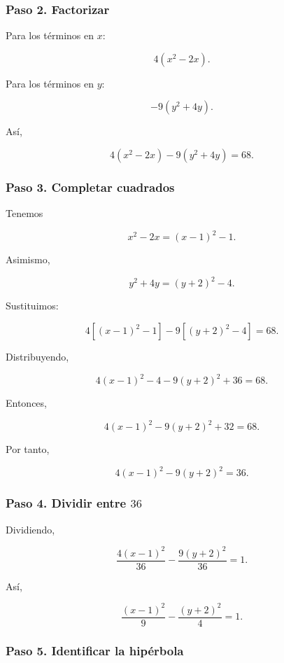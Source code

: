 \documentclass[12pt]{article}
\theoremstyle{plain}
\theoremstyle{definition}
\theoremstyle{remark}
\begin{document}
{%
\subsubsection*{Paso 2. Factorizar}

Para los términos en \(x\):

\[
4(x^2-2x).
\]

Para los términos en \(y\):

\[
-9(y^2+4y).
\]

Así,

\[
4(x^2-2x)-9(y^2+4y)=68.
\]

\subsubsection*{Paso 3. Completar cuadrados}

Tenemos

\[
x^2-2x
=
(x-1)^2-1.
\]

Asimismo,

\[
y^2+4y
=
(y+2)^2-4.
\]

Sustituimos:

\[
4\left[(x-1)^2-1\right]
-
9\left[(y+2)^2-4\right]
=
68.
\]

Distribuyendo,

\[
4(x-1)^2-4
-
9(y+2)^2
+
36
=
68.
\]

Entonces,

\[
4(x-1)^2
-
9(y+2)^2
+
32
=
68.
\]

Por tanto,

\[
4(x-1)^2-9(y+2)^2=36.
\]

\subsubsection*{Paso 4. Dividir entre \(36\)}

Dividiendo,

\[
\frac{4(x-1)^2}{36}
-
\frac{9(y+2)^2}{36}
=
1.
\]

Así,

\[
\boxed{
\frac{(x-1)^2}{9}
-
\frac{(y+2)^2}{4}
=
1.
}
\]

\subsubsection*{Paso 5. Identificar la hipérbola}

}
\end{document}
